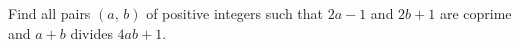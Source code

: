 Find all pairs $(a,\, b)$ of positive integers such that $2a-1$ and $2b+1$ are coprime and $a+b$ divides $4ab+1.$